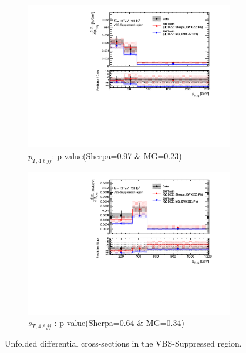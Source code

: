 \begin{figure}[!htb]
\begin{subfigure}{.49\textwidth}
        \includegraphics[width=.98\linewidth]{figures/Results/CrossSection_VBSSuppressed/xs_ptzzjj_CR.pdf}
        \caption{ \footnotesize{$p_{T,4\ell jj}$}: p-value(Sherpa=0.97 $\&$ MG=0.23)}
    \end{subfigure}
    \begin{subfigure}{.49\textwidth}
        \centering
        \includegraphics[width=.98\linewidth]{figures/Results/CrossSection_VBSSuppressed/xs_stzzjj_CR.pdf}
        \caption{ \footnotesize{$s_{T, 4\ell jj}$ }: p-value(Sherpa=0.64 $\&$ MG=0.34)}
    \end{subfigure}
    \caption{Unfolded differential cross-sections in the VBS-Suppressed region.}  \label{fig:unfolded_xs_VBS_Suppressed_a}
\end{figure}

